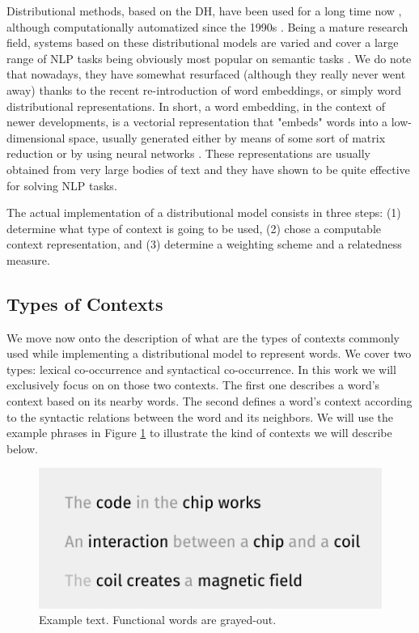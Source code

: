 Distributional methods, based on the DH, have been used for a long time now \cite{JurafskyM09}, although computationally automatized since the 1990s \cite{perinet2015}. Being a mature research field, systems based on these distributional models are varied and cover a large range of NLP tasks being obviously most popular on semantic tasks \cite{bruni2014multimodal}. We do note that nowadays, they have somewhat resurfaced (although they really never went away) thanks to the recent re-introduction of word embeddings, or simply word distributional representations. In short, a word embedding, in the context of newer developments, is a vectorial representation  that "embeds" words into a low-dimensional space, usually generated either by means of some sort of matrix reduction \cite{lebret2013deep,levy2014neural} or by using neural networks \cite{Collobert2011,mikolov2013distributed}. These representations are usually obtained from very large bodies of text and they have shown to be quite effective for solving NLP tasks.

The actual implementation of a distributional model consists in three steps: (1) determine what type of context is going to be used, (2) chose a computable context representation, and (3) determine a weighting scheme  and a  relatedness measure.

\subsection{Types of Contexts}
We move now onto the description of what are the types of contexts commonly used while implementing a distributional model to represent words.  We cover two types: lexical co-occurrence and syntactical co-occurrence. In this work we will exclusively focus on on those two contexts. The first one describes a word's context based on its nearby words.  The second defines a word's context according to the syntactic relations between the word and its neighbors. We will use the example phrases in Figure \ref{fig:example_phrases} to illustrate the kind of contexts we will describe below. 
\begin{figure}
\centering
\includegraphics[width=0.7\linewidth]{images/Chapitre2/example_phrases.pdf}
\caption{Example text. Functional words are grayed-out. }
\label{fig:example_phrases}
\end{figure}

